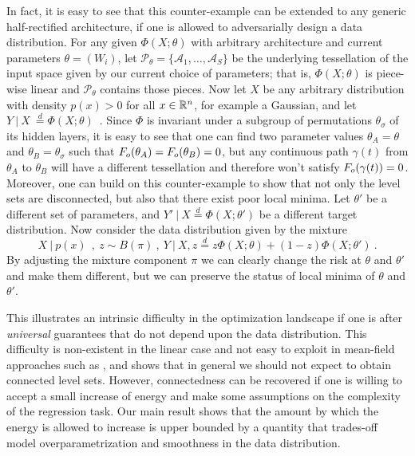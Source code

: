 In fact, it is easy to see that this counter-example can be extended to any generic half-rectified architecture, if one is 
allowed to adversarially design a data distribution. For any given $\Phi(X; \theta)$ with arbitrary architecture and current parameters 
$\theta = (W_i)$, let $\mathcal{P}_\theta=\{ \mathcal{A}_1, \dots, \mathcal{A}_S\}$ be the underlying tessellation of the input space given by our current choice of parameters; that is, $\Phi(X; \theta)$ is piece-wise linear and $\mathcal{P}_\theta$ contains those pieces. Now let 
$X$ be any arbitrary distribution with density $p(x) > 0$ for all $x \in {\mathbb{R}}^n$, for example a Gaussian, and let %
$Y ~|~X ~\stackrel{d}{=} \Phi(X ; \theta)$~. Since $\Phi$ is invariant under a subgroup of permutations $\theta_\sigma$ of its hidden layers, it is easy to see that one can find two parameter values $\theta_A = \theta$ and $\theta_B = \theta_\sigma$ such that $F_{o}(\theta_A) = F_{o}(\theta_B) = 0$, but any continuous path $\gamma(t)$ from $\theta_A$ to $\theta_B$ will have a different tessellation and therefore won't satisfy $F_{o}( \gamma(t) ) = 0$. 
Moreover, one can build on this counter-example to show that not only the level sets are disconnected, but also that there exist poor local minima. Let $\theta'$ be a different set of parameters, and $Y' ~|~X \stackrel{d}{=} \Phi(X; \theta')$ be a different target distribution. Now consider the data distribution given by the mixture
$$X ~|~p(x) ~~,~z \sim B(\pi)~,~Y ~|~X,z \stackrel{d}{=} z \Phi(X;\theta) + (1-z) \Phi(X; \theta')~.$$
By adjusting the mixture component $\pi$ we can clearly change the risk at $\theta$ and $\theta'$ and make them different, but we can preserve the status of local minima of $\theta$ and $\theta'$. 
 
This illustrates an intrinsic difficulty in the optimization landscape if one is after \emph{universal} 
guarantees that do not depend upon the data distribution. This difficulty is non-existent in the linear case 
and not easy to exploit in mean-field approaches such as \cite{choromanska2015loss}, 
and shows that in general 
we should not expect to obtain connected level sets. However, 
connectedness can be recovered if one is willing to accept a small increase 
of energy and make some assumptions on the complexity of the regression task.
 Our main result shows that the amount by which the energy is 
allowed to increase is upper bounded by a quantity that trades-off model overparametrization 
and smoothness in the data distribution.

